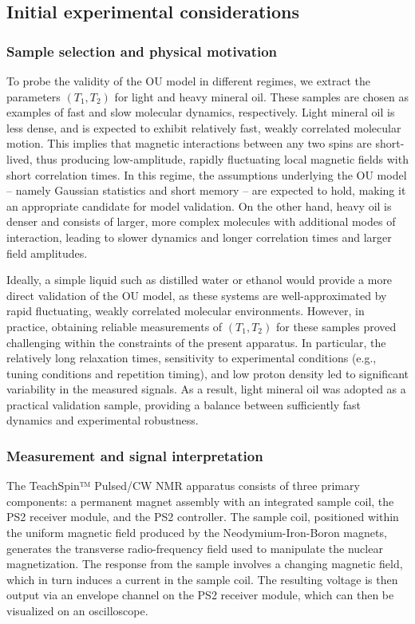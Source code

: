 \documentclass[%
 reprint,
 amsmath,amssymb,
 aps,
]{revtex4-2}
\begin{document}
\subsection{Initial experimental considerations}
\label{sec:considerations}

\subsubsection{Sample selection and physical motivation}
\label{sec:samples}
To probe the validity of the OU model in different regimes, we extract the parameters $(T_1,T_2)$ for light and heavy mineral oil. These samples are chosen as examples of fast and slow molecular dynamics, respectively. Light mineral oil is less dense, and is expected to exhibit relatively fast, weakly correlated molecular motion. This implies that magnetic interactions between any two spins are short-lived, thus producing low-amplitude, rapidly fluctuating local magnetic fields with short correlation times. In this regime, the assumptions underlying the OU model -- namely Gaussian statistics and short memory -- are expected to hold, making it an appropriate candidate for model validation. On the other hand, heavy oil is denser and consists of larger, more complex molecules with additional modes of interaction, leading to slower dynamics and longer correlation times and larger field amplitudes.

Ideally, a simple liquid such as distilled water or ethanol would provide a more direct validation of the OU model, as these systems are well-approximated by rapid fluctuating, weakly correlated molecular environments. However, in practice, obtaining reliable measurements of $(T_1, T_2)$ for these samples proved challenging within the constraints of the present apparatus. In particular, the relatively long relaxation times, sensitivity to experimental conditions (e.g., tuning conditions and repetition timing), and low proton density \cite{teachspin_ps2} led to significant variability in the measured signals. As a result, light mineral oil was adopted as a practical validation sample, providing a balance between sufficiently fast dynamics and experimental robustness.

\subsubsection{Measurement and signal interpretation}
\label{sec:signal}
The TeachSpin™ Pulsed/CW NMR apparatus consists of three primary components: a permanent magnet assembly with an integrated sample coil, the PS2 receiver module, and the PS2 controller. The sample coil, positioned within the uniform magnetic field produced by the Neodymium-Iron-Boron magnets, generates the transverse radio-frequency field used to manipulate the nuclear magnetization. The response from the sample involves a changing magnetic field, which in turn induces a current in the sample coil. The resulting voltage is then output via an envelope channel on the PS2 receiver module, which can then be visualized on an oscilloscope. 
\end{document}
